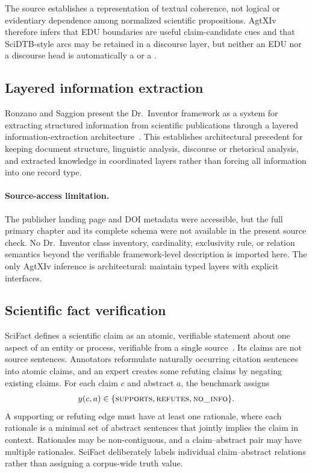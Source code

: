 The source establishes a representation of textual coherence, not logical or evidentiary dependence among normalized scientific propositions. AgtXIv therefore infers that EDU boundaries are useful claim-candidate cues and that SciDTB-style arcs may be retained in a discourse layer, but neither an EDU nor a discourse head is automatically a \ScientificClaim{} or a \ClaimRelation{}.

\subsection{Layered information extraction}

Ronzano and Saggion present the Dr.~Inventor framework as a system for extracting structured information from scientific publications through a layered information-extraction architecture~\cite{ronzano2015drinventor}. This establishes architectural precedent for keeping document structure, linguistic analysis, discourse or rhetorical analysis, and extracted knowledge in coordinated layers rather than forcing all information into one record type.

\paragraph{Source-access limitation.}
The publisher landing page and DOI metadata were accessible, but the full primary chapter and its complete schema were not available in the present source check. No Dr.~Inventor class inventory, cardinality, exclusivity rule, or relation semantics beyond the verifiable framework-level description is imported here. The only AgtXIv inference is architectural: maintain typed layers with explicit interfaces.

\subsection{Scientific fact verification}

SciFact defines a scientific claim as an atomic, verifiable statement about one aspect of an entity or process, verifiable from a single source~\cite{wadden2020scifact}. Its claims are not source sentences. Annotators reformulate naturally occurring citation sentences into atomic claims, and an expert creates some refuting claims by negating existing claims. For each claim $c$ and abstract $a$, the benchmark assigns
\begin{align*}
y(c,a) \in \{\textsc{supports},\textsc{refutes},\textsc{no\_info}\}.
\end{align*}
A supporting or refuting edge must have at least one rationale, where each rationale is a minimal set of abstract sentences that jointly implies the claim in context. Rationales may be non-contiguous, and a claim--abstract pair may have multiple rationales. SciFact deliberately labels individual claim--abstract relations rather than assigning a corpus-wide truth value.

